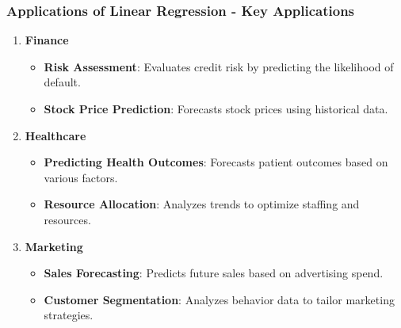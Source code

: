 \documentclass{beamer}
\begin{document}
\begin{frame}[fragile]
    \frametitle{Applications of Linear Regression - Key Applications}
    \begin{enumerate}
        \item \textbf{Finance}
            \begin{itemize}
                \item \textbf{Risk Assessment}: Evaluates credit risk by predicting the likelihood of default.
                \item \textbf{Stock Price Prediction}: Forecasts stock prices using historical data.
            \end{itemize}

        \item \textbf{Healthcare}
            \begin{itemize}
                \item \textbf{Predicting Health Outcomes}: Forecasts patient outcomes based on various factors.
                \item \textbf{Resource Allocation}: Analyzes trends to optimize staffing and resources.
            \end{itemize}

        \item \textbf{Marketing}
            \begin{itemize}
                \item \textbf{Sales Forecasting}: Predicts future sales based on advertising spend.
                \item \textbf{Customer Segmentation}: Analyzes behavior data to tailor marketing strategies.
            \end{itemize}
    \end{enumerate}
\end{frame}
\end{document}
